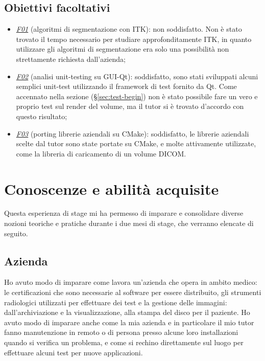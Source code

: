 \subsection{Obiettivi facoltativi}
\begin{itemize}
	 \item \underline{\textit{F01}} (algoritmi di segmentazione con ITK): non soddisfatto. Non è stato trovato il tempo necessario per studiare approfonditamente ITK, in quanto utilizzare gli algoritmi di segmentazione era solo una possibilità non strettamente richiesta dall'azienda;
	 \item \underline{\textit{F02}} (analisi unit-testing su GUI-Qt): soddisfatto, sono stati sviluppati alcuni semplici unit-test utilizzando il framework di test fornito da Qt. Come accennato nella sezione  (§\ref{sec:test-begin}) non è stato possibile fare un vero e proprio test sul render del volume, ma il tutor si è trovato d'accordo con questo risultato;
	 \item \underline{\textit{F03}} (porting librerie aziendali su CMake): soddisfatto, le librerie aziendali scelte dal tutor sono state portate su CMake, e molte attivamente utilizzate, come la libreria di caricamento di un volume DICOM.
\end{itemize}

\section{Conoscenze e abilità acquisite}
Questa esperienza di stage mi ha permesso di imparare e consolidare diverse nozioni teoriche e pratiche durante i due mesi di stage, che verranno elencate di seguito.

\subsection{Azienda}
Ho avuto modo di imparare come lavora un'azienda che opera in ambito medico: le certificazioni che sono necessarie al software per essere distribuito, gli strumenti radiologici utilizzati per effettuare dei test e la gestione delle immagini: dall'archiviazione e la visualizzazione, alla stampa del disco per il paziente. Ho avuto modo di imparare anche come la mia azienda e in particolare il mio tutor fanno manutenzione in remoto o di persona presso alcune loro installazioni quando si verifica un problema, e come si rechino direttamente sul luogo per effettuare alcuni test per nuove applicazioni.

